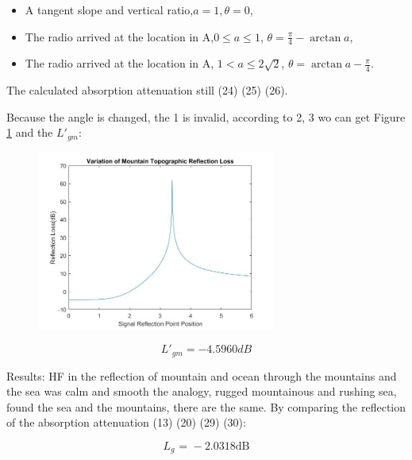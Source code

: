 \documentclass{mcmthesis}
\begin{document}


\begin{itemize}
\item A tangent slope and vertical ratio,$a = 1,\theta  = 0$,
\item The radio arrived at the location in A,$0 \leqslant a \leqslant 1$, $\theta  = \frac{\pi }{4} - \arctan a$,
\item The radio arrived at the location in A, $1 < a \leqslant 2\sqrt 2 $, $\theta  = \arctan a - \frac{\pi }{4}$.
\end{itemize}

The calculated absorption attenuation still (24) (25) (26).

Because the angle is changed, the 1 is invalid, according to 2, 3 wo can get Figure \ref{fig:1} and the $L{'_{gm}}$:

\begin{figure}[htbp]
  \centering
 
  \includegraphics[width=0.7\textwidth]{./picture/plot_2.jpg}
	\caption{}\label{fig:1} 
\end{figure}

\begin{equation} \label{31}
L{'_{gm}} =  - 4.5960dB
\end{equation}

Results: HF in the reflection of mountain and ocean through the mountains and the sea was calm and smooth the analogy, rugged mountainous and rushing sea, found the sea and the mountains, there are the same. By comparing the reflection of the absorption attenuation (13) (20) (29) (30):

\begin{equation} \label{32}
{L_g}{\text{ = }} - 2.0318{\text{dB}}
\end{equation}
\end{document}
